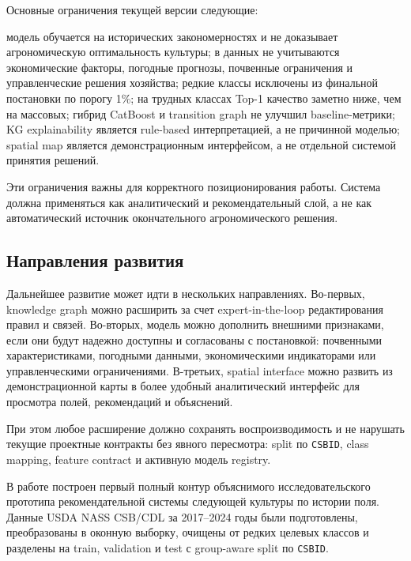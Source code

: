 \documentclass[a4paper,article,14pt]{extarticle}
\begin{document}
Основные ограничения текущей версии следующие:
\begin{itemize}
    \ITEM модель обучается на исторических закономерностях и не доказывает агрономическую оптимальность культуры;
    \ITEM в данных не учитываются экономические факторы, погодные прогнозы, почвенные ограничения и управленческие решения хозяйства;
    \ITEM редкие классы исключены из финальной постановки по порогу 1\%;
    \ITEM на трудных классах Top-1 качество заметно ниже, чем на массовых;
    \ITEM гибрид CatBoost и transition graph не улучшил baseline-метрики;
    \ITEM KG explainability является rule-based интерпретацией, а не причинной моделью;
    \ITEM spatial map является демонстрационным интерфейсом, а не отдельной системой принятия решений.
\end{itemize}

Эти ограничения важны для корректного позиционирования работы. Система должна применяться как аналитический и рекомендательный слой, а не как автоматический источник окончательного агрономического решения.

\subsection{Направления развития}

Дальнейшее развитие может идти в нескольких направлениях. Во-первых, knowledge graph можно расширить за счет expert-in-the-loop редактирования правил и связей. Во-вторых, модель можно дополнить внешними признаками, если они будут надежно доступны и согласованы с постановкой: почвенными характеристиками, погодными данными, экономическими индикаторами или управленческими ограничениями. В-третьих, spatial interface можно развить из демонстрационной карты в более удобный аналитический интерфейс для просмотра полей, рекомендаций и объяснений.

При этом любое расширение должно сохранять воспроизводимость и не нарушать текущие проектные контракты без явного пересмотра: split по \texttt{CSBID}, class mapping, feature contract и активную модель registry.


В работе построен первый полный контур объяснимого исследовательского прототипа рекомендательной системы следующей культуры по истории поля. Данные USDA NASS CSB/CDL за 2017--2024 годы были подготовлены, преобразованы в оконную выборку, очищены от редких целевых классов и разделены на train, validation и test с group-aware split по \texttt{CSBID}.
\end{document}
